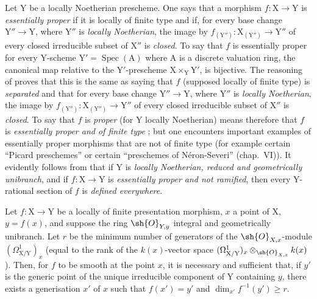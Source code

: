 \begin{remark}[18.10.20]
\label{IV.18.10.20}
Let $\mathrm{Y}$ be a locally Noetherian prescheme.
One says that a morphism $f:\mathrm{X}\to\mathrm{Y}$ is \emph{essentially proper} if it is locally of finite type and if, for every base change $\mathrm{Y}''\to\mathrm{Y}$, where $\mathrm{Y}''$ is \emph{locally Noetherian}, the image by $f_{(\mathrm{Y}'')}:\mathrm{X}_{(\mathrm{Y}'')}\to\mathrm{Y}''$ of every closed irreducible subset of $\mathrm{X}''$ is \emph{closed}.
To say that $f$ is essentially proper for every $\mathrm{Y}$-scheme $\mathrm{Y}'=\operatorname{Spec}(\mathrm{A})$ where $\mathrm{A}$ is a discrete valuation ring, the canonical map  relative to the $\mathrm{Y}'$-prescheme $\mathrm{X}\times_{\mathrm{Y}}\mathrm{Y}'$, is bijective.
The reasoning of  proves that this is the same as saying that $f$ (supposed locally of finite type) is \emph{separated} and that for every base change $\mathrm{Y}''\to\mathrm{Y}$, where $\mathrm{Y}''$ is \emph{locally Noetherian}, the image by $f_{(\mathrm{Y}'')}: \mathrm{X}_{(\mathrm{Y}'')}\to\mathrm{Y}''$ of every closed irreducible subset of $\mathrm{X}''$ is \emph{closed}.
To say that $f$ is \emph{proper} (for $\mathrm{Y}$ locally Noetherian) means therefore that $f$ is \emph{essentially proper and of finite type} ; but one encounters important examples of essentially proper morphisms that are not of finite type (for example certain ``Picard preschemes'' or certain ``preschemes of N\'eron-Severi'' (chap.~VI)).
It evidently follows from  that if $\mathrm{Y}$ is \emph{locally Noetherian, reduced and geometrically unibranch}, and if $f:\mathrm{X}\to\mathrm{Y}$ is \emph{essentially proper and not ramified}, then every $\mathrm{Y}$-rational section of $f$ is \emph{defined everywhere}.
\end{remark}

\begin{proposition}[18.10.21]
\label{IV.18.10.21}
Let $f:\mathrm{X}\to\mathrm{Y}$ be a locally of finite presentation morphism, $x$ a point of $\mathrm{X}$, $y=f(x)$, and suppose the ring $\sh{O}_{Y,y}$ integral and geometrically unibranch.
Let $r$ be the minimum number of generators of the $\sh{O}_{X,x}$-module $(\Omega^1_{\mathrm{X}/\mathrm{Y}})_x$ (equal to the rank of the $k(x)$-vector space $(\Omega^1_{\mathrm{X}/\mathrm{Y}})_x\otimes_{\sh{O}_{X,x}}k(x)$).
Then, for $f$ to be smooth at the point $x$, it is necessary and sufficient that, if $y'$ is the generic point of the unique irreducible component of $\mathrm{Y}$ containing $y$, there exists a generisation $x'$ of $x$ such that $f(x')=y'$ and $\dim_{x'}f^{-1}(y')\geq r$.
\end{proposition}

